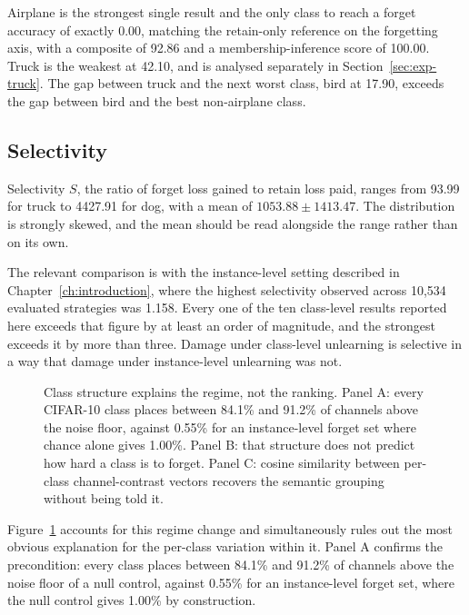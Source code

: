 Airplane is the strongest single result and the only class to reach a forget
accuracy of exactly 0.00, matching the retain-only reference on the forgetting
axis, with a composite of 92.86 and a membership-inference score of 100.00. Truck
is the weakest at 42.10, and is analysed separately in
Section~\ref{sec:exp-truck}. The gap between truck and the next worst class, bird
at 17.90, exceeds the gap between bird and the best non-airplane class.

\subsection{Selectivity}

Selectivity $S$, the ratio of forget loss gained to retain loss paid, ranges from
93.99 for truck to 4427.91 for dog, with a mean of $1053.88 \pm 1413.47$. The
distribution is strongly skewed, and the mean should be read alongside the range
rather than on its own.

The relevant comparison is with the instance-level setting described in
Chapter~\ref{ch:introduction}, where the highest selectivity observed across
10{,}534 evaluated strategies was 1.158. Every one of the ten class-level results
reported here exceeds that figure by at least an order of magnitude, and the
strongest exceeds it by more than three. Damage under class-level unlearning is
selective in a way that damage under instance-level unlearning was not.

\begin{figure}[htbp]
  \centering
  \caption{Class structure explains the regime, not the ranking. Panel A: every
  CIFAR-10 class places between 84.1\% and 91.2\% of channels above the noise
  floor, against 0.55\% for an instance-level forget set where chance alone gives
  1.00\%. Panel B: that structure does not predict how hard a class is to forget.
  Panel C: cosine similarity between per-class channel-contrast vectors recovers
  the semantic grouping without being told it.}
  \label{fig:class-structure}
\end{figure}

Figure~\ref{fig:class-structure} accounts for this regime change and
simultaneously rules out the most obvious explanation for the per-class variation
within it. Panel A confirms the precondition: every class places between 84.1\%
and 91.2\% of channels above the noise floor of a null control, against 0.55\% for
an instance-level forget set, where the null control gives 1.00\% by construction.


